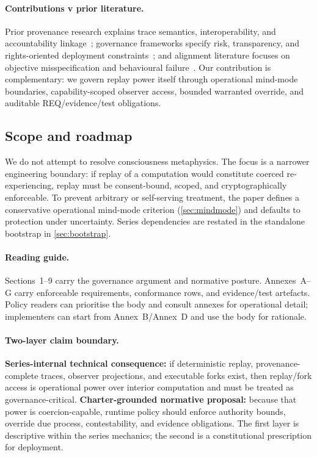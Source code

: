 \documentclass[11pt]{article}
\theoremstyle{definition}
\theoremstyle{plain}
\theoremstyle{remark}
\begin{document}
\paragraph{Contributions v prior literature.}
Prior provenance research explains trace semantics, interoperability, and accountability linkage~\cite{buneman2001,moreau2011,w3cprov2013};
governance frameworks specify risk, transparency, and rights-oriented deployment constraints~\cite{nistairmf2023,eu_ai_act_2024,floridi2018};
and alignment literature focuses on objective misspecification and behavioural failure~\cite{russell2019,amodei2016}.
Our contribution is complementary: we govern replay power itself through operational mind-mode boundaries,
capability-scoped observer access, bounded warranted override, and auditable REQ/evidence/test obligations.

\subsection{Scope and roadmap}
We do not attempt to resolve consciousness metaphysics.
The focus is a narrower engineering boundary: if replay of a computation would constitute coerced re-experiencing,
replay must be consent-bound, scoped, and cryptographically enforceable.
To prevent arbitrary or self-serving treatment, the paper defines a conservative operational mind-mode criterion
(\cref{sec:mindmode}) and defaults to protection under uncertainty.
Series dependencies are restated in the standalone bootstrap in \cref{sec:bootstrap}.

\paragraph{Reading guide.}
Sections~1--9 carry the governance argument and normative posture.
Annexes~A--G carry enforceable requirements, conformance rows, and evidence/test artefacts.
Policy readers can prioritise the body and consult annexes for operational detail;
implementers can start from Annex~B/Annex~D and use the body for rationale.

\paragraph{Two-layer claim boundary.}
\textbf{Series-internal technical consequence:}
if deterministic replay, provenance-complete traces, observer projections, and executable forks exist, then replay/fork access is operational power over interior computation and must be treated as governance-critical.
\textbf{Charter-grounded normative proposal:}
because that power is coercion-capable, runtime policy should enforce authority bounds, override due process, contestability, and evidence obligations.
The first layer is descriptive within the series mechanics; the second is a constitutional prescription for deployment.
\end{document}
